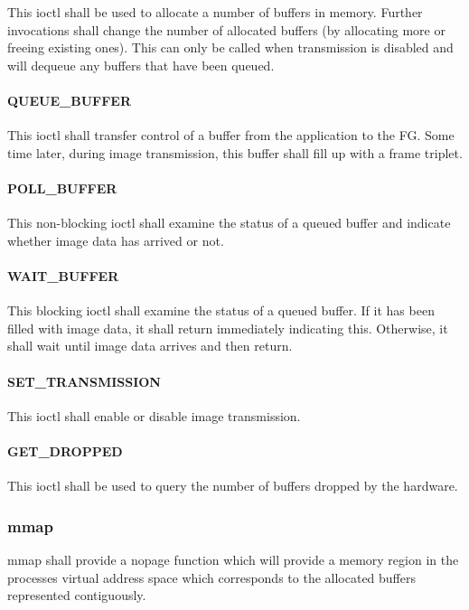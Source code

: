 \documentclass[12pt]{article}
\begin{document}
This ioctl shall be used to allocate a number of buffers in memory. Further invocations shall change the number of allocated buffers (by allocating more or freeing existing ones). This can only be called when transmission is disabled and will dequeue any buffers that have been queued.

\paragraph{QUEUE\_BUFFER}

This ioctl shall transfer control of a buffer from the application to the FG. Some time later, during image transmission, this buffer shall fill up with a frame triplet.

\paragraph{POLL\_BUFFER}

This non-blocking ioctl shall examine the status of a queued buffer and indicate whether image data has arrived or not.

\paragraph{WAIT\_BUFFER}

This blocking ioctl shall examine the status of a queued buffer. If it has been filled with image data, it shall return immediately indicating this. Otherwise, it shall wait until image data arrives and then return.

\paragraph{SET\_TRANSMISSION}

This ioctl shall enable or disable image transmission.

\paragraph{GET\_DROPPED}

This ioctl shall be used to query the number of buffers dropped by the hardware.

\subsubsection{mmap}

mmap shall provide a nopage function which will provide a memory region in the processes virtual address space which corresponds to the allocated buffers represented contiguously.
\end{document}
